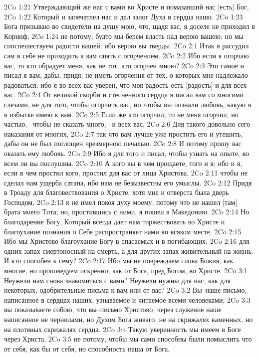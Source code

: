 2Co 1:21  Утверждающий же нас с вами во Христе и помазавший нас [есть] Бог,
2Co 1:22  Который и запечатлел нас и дал залог Духа в сердца наши.
2Co 1:23  Бога призываю во свидетели на душу мою, что, щадя вас, я доселе не приходил в Коринф,
2Co 1:24  не потому, будто мы берем власть над верою вашею; но мы споспешествуем радости вашей: ибо верою вы тверды.
2Co 2:1  Итак я рассудил сам в себе не приходить к вам опять с огорчением.
2Co 2:2  Ибо если я огорчаю вас, то кто обрадует меня, как не тот, кто огорчен мною?
2Co 2:3  Это самое и писал я вам, дабы, придя, не иметь огорчения от тех, о которых мне надлежало радоваться: ибо я во всех вас уверен, что моя радость есть [радость] и для всех вас.
2Co 2:4  От великой скорби и стесненного сердца я писал вам со многими слезами, не для того, чтобы огорчить вас, но чтобы вы познали любовь, какую я в избытке имею к вам.
2Co 2:5  Если же кто огорчил, то не меня огорчил, но частью, --чтобы не сказать много, --и всех вас.
2Co 2:6  Для такого довольно сего наказания от многих,
2Co 2:7  так что вам лучше уже простить его и утешить, дабы он не был поглощен чрезмерною печалью.
2Co 2:8  И потому прошу вас оказать ему любовь.
2Co 2:9  Ибо я для того и писал, чтобы узнать на опыте, во всем ли вы послушны.
2Co 2:10  А кого вы в чем прощаете, того и я; ибо и я, если в чем простил кого, простил для вас от лица Христова,
2Co 2:11  чтобы не сделал нам ущерба сатана, ибо нам не безызвестны его умыслы.
2Co 2:12  Придя в Троаду для благовествования о Христе, хотя мне и отверста была дверь Господом,
2Co 2:13  я не имел покоя духу моему, потому что не нашел [там] брата моего Тита; но, простившись с ними, я пошел в Македонию.
2Co 2:14  Но благодарение Богу, Который всегда дает нам торжествовать во Христе и благоухание познания о Себе распространяет нами во всяком месте.
2Co 2:15  Ибо мы Христово благоухание Богу в спасаемых и в погибающих:
2Co 2:16  для одних запах смертоносный на смерть, а для других запах живительный на жизнь. И кто способен к сему?
2Co 2:17  Ибо мы не повреждаем слова Божия, как многие, но проповедуем искренно, как от Бога, пред Богом, во Христе.
2Co 3:1  Неужели нам снова знакомиться с вами? Неужели нужны для нас, как для некоторых, одобрительные письма к вам или от вас?
2Co 3:2  Вы--наше письмо, написанное в сердцах наших, узнаваемое и читаемое всеми человеками;
2Co 3:3  вы показываете собою, что вы--письмо Христово, через служение наше написанное не чернилами, но Духом Бога живаго, не на скрижалях каменных, но на плотяных скрижалях сердца.
2Co 3:4  Такую уверенность мы имеем в Боге через Христа,
2Co 3:5  не потому, чтобы мы сами способны были помыслить что от себя, как бы от себя, но способность наша от Бога.

